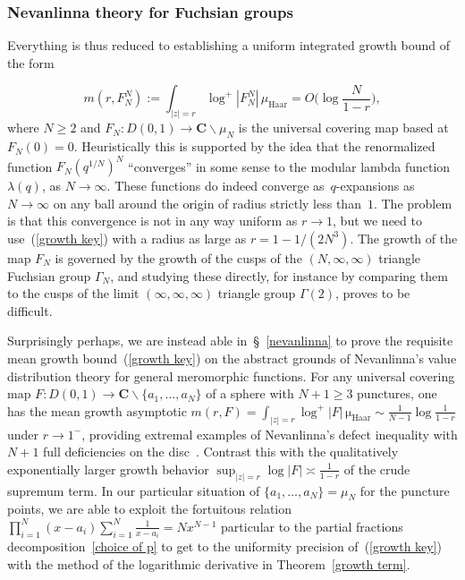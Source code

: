 \documentclass[10pt]{amsart}
\def\SSSS{\S}
\renewcommand\setminus{\smallsetminus}
\theoremstyle{remark}
\numberwithin{equation}{subsection}
\def\numequation{\addtocounter{subsubsection}{1}\begin{equation}}
\def\C{\mathbf{C}}
\begin{document}
\subsubsection{Nevanlinna theory for Fuchsian groups}  \label{Nevone}
Everything is thus reduced to establishing a uniform integrated growth bound of the form
\numequation \label{growth key}
m(r,F_N^N) := \int_{|z| = r} \log^+{|F_N^N|} \, \mu_{\mathrm{Haar}} = O\Big(\log{\frac{N}{1-r}}\Big),
\end{equation}
 where $N \geq 2$ and $F_N : D(0,1) \to \C \setminus \mu_N$ is the universal covering map based at $F_N(0) = 0$. 
Heuristically this is supported by the idea that the renormalized function
$F_N(q^{1/N})^N$ ``converges'' in some sense to the modular lambda function $\lambda(q)$, as $N \to \infty$. 
These functions do indeed converge as~$q$-expansions as~$N \rightarrow \infty$ on any ball around the origin of radius strictly
less than~$1$.
The problem is that this convergence is not in any way uniform as $r \to 1$, but we need to use~(\ref{growth key}) with
a radius as large as $r = 1 - 1/(2N^3)$. The growth of the map $F_N$ is governed by the growth of the cusps of the $(N, \infty, \infty)$ triangle  Fuchsian group $\Gamma_N$, and studying these directly, for instance by comparing them to the cusps of the limit $(\infty, \infty, \infty)$ triangle group $\Gamma(2)$, proves to be difficult. 

Surprisingly perhaps, we are instead able in~\SSSS~\ref{nevanlinna} to prove the requisite mean growth bound~(\ref{growth key}) on the 
abstract grounds of Nevanlinna's value distribution theory for general meromorphic functions.  For any universal covering map $F : D(0,1) \to \C \setminus \{a_1, \ldots, a_N\}$ of a sphere with  $N+1 \geq 3$ punctures, one has the mean growth asymptotic $m(r, F) = \int_{|z| = r} \log^+{|F|} \, \mathrm{\mu}_{\mathrm{Haar}} \sim \frac{1}{N-1} \log{\frac{1}{1-r}}$ under $r \to 1^-$, 
providing extremal examples of Nevanlinna's defect inequality with $N+1$ full deficiencies on the disc~\cite[page~272]{Nevanlinna}. Contrast this with the
qualitatively exponentially larger growth behavior $\sup_{|z| = r} \log{|F|} \asymp \frac{1}{1-r}$ of the crude supremum term.  
In our particular situation of $\{a_1, \ldots, a_N\} = \mu_N$ for the puncture points, we are able to exploit 
the fortuitous relation $ \prod_{i=1}^N (x-a_i) \sum_{i=1}^N \frac{1}{x-a_i} = Nx^{N-1}$ particular
to the partial fractions decomposition~\eqref{choice of p} to get to the uniformity precision of~(\ref{growth key}) 
with the method of the logarithmic derivative in Theorem~\ref{growth term}. 
\end{document}
